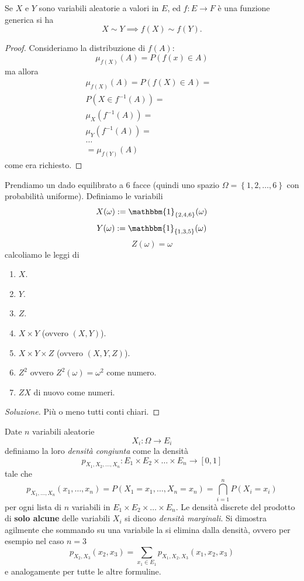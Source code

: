 \documentclass[11pt]{scrartcl}
\begin{document}
	\begin{proposition}
		Se $X$ e $Y$ sono variabili aleatorie a valori in $E$, ed $f:E\to F$ è una funzione generica si ha
		$$X\sim Y \implies f(X)\sim f(Y).$$
	\end{proposition}
	\begin{proof}
		Consideriamo la distribuzione di $f(A)$:
		$$\mu_{f(X)}(A)=P\left(f(x)\in A\right)$$
		ma allora 
		\begin{align*}
			\mu_{f(X)}(A)=P\left(f(X)\in A\right)= & \\
			P(X\in f^{-1}(A))= & \\
			\mu_X(f^{-1}(A))=  & \\
			\mu_Y(f^{-1}(A))=  & \\
			\dots & \\
			=\mu_{f(Y)}(A) & 
		\end{align*}
		come era richiesto.
	\end{proof}
	\begin{example}
		Prendiamo un dado equilibrato a $6$ facce (quindi uno spazio $\Omega=\left\{1,2,\dots,6\right\}$ con probabilità uniforme). Definiamo le variabili
		$$X(\omega):=\mathbbm{1}_{\left\{2,4,6\right\}}(\omega)$$
		$$Y(\omega):=\mathbbm{1}_{\left\{1,3,5\right\}}(\omega)$$
		$$Z(\omega)=\omega$$
		calcoliamo le leggi di 
		\begin{enumerate}
			\item $X$.
			\item $Y$.
			\item $Z$.
			\item $X\times Y$ (ovvero $(X,Y)$).
			\item $X\times Y \times Z$ (ovvero $(X,Y,Z)$).
			\item $Z^2$ ovvero $Z^2(\omega)=\omega^2$ come numero.
			\item $ZX$ di nuovo come numeri.
		\end{enumerate}
	\end{example}
	\begin{proof}[Soluzione]
		Più o meno tutti conti chiari.
	\end{proof}
	\begin{definition}
		Date $n$ variabili aleatorie 
		$$X_i:\Omega\to E_i$$
		definiamo la loro \textit{densità congiunta} come la densità
		$$p_{X_1,X_2,\dots,X_n}:E_1\times E_2\times\dots\times E_n\to [0,1]$$
		tale che 
		$$p_{X_1,\dots,X_n}(x_1,\dots,x_n)=P(X_1=x_1,\dots,X_n=x_n)=\bigcap_{i=1}^n P(X_i=x_i)$$
		per ogni lista di $n$ variabili in $E_1\times E_2\times \dots \times E_n$. Le densità discrete del prodotto di \textbf{solo alcune} delle variabili $X_i$ si dicono \textit{densità marginali}. Si dimostra agilmente che sommando su una variabile la si elimina dalla densità, ovvero per esempio nel caso $n=3$
		$$p_{X_2,X_3}(x_2,x_3)=\sum_{x_1\in E_1}p_{X_1,X_2,X_3}(x_1,x_2,x_3)$$
		e analogamente per tutte le altre formuline.
	\end{definition}
\end{document}
